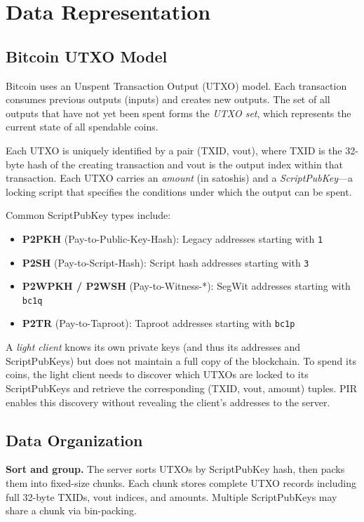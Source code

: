 \section{Data Representation}
\label{sec:data}

\subsection{Bitcoin UTXO Model}

Bitcoin uses an Unspent Transaction Output (UTXO) model. Each transaction consumes previous outputs (inputs) and creates new outputs. The set of all outputs that have not yet been spent forms the \emph{UTXO set}, which represents the current state of all spendable coins.

Each UTXO is uniquely identified by a pair (TXID, vout), where TXID is the 32-byte hash of the creating transaction and vout is the output index within that transaction. Each UTXO carries an \emph{amount} (in satoshis) and a \emph{ScriptPubKey}---a locking script that specifies the conditions under which the output can be spent.

Common ScriptPubKey types include:
\begin{itemize}[nolistsep,leftmargin=*]
    \item \textbf{P2PKH} (Pay-to-Public-Key-Hash): Legacy addresses starting with \texttt{1}
    \item \textbf{P2SH} (Pay-to-Script-Hash): Script hash addresses starting with \texttt{3}
    \item \textbf{P2WPKH / P2WSH} (Pay-to-Witness-*): SegWit addresses starting with \texttt{bc1q}
    \item \textbf{P2TR} (Pay-to-Taproot): Taproot addresses starting with \texttt{bc1p}
\end{itemize}

A \emph{light client} knows its own private keys (and thus its addresses and ScriptPubKeys) but does not maintain a full copy of the blockchain. To spend its coins, the light client needs to discover which UTXOs are locked to its ScriptPubKeys and retrieve the corresponding (TXID, vout, amount) tuples. PIR enables this discovery without revealing the client's addresses to the server.

\subsection{Data Organization}

\textbf{Sort and group.} The server sorts UTXOs by ScriptPubKey hash, then packs them into fixed-size chunks. Each chunk stores complete UTXO records including full 32-byte TXIDs, vout indices, and amounts. Multiple ScriptPubKeys may share a chunk via bin-packing.

